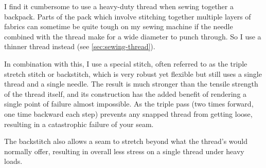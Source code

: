 I find it cumbersome to use a heavy-duty thread when sewing together a backpack. Parts of the pack which involve stitching together multiple layers of fabrics can sometime be quite tough on my sewing machine if the needle combined with the thread make for a wide diameter to punch through. So I use a thinner thread instead (see \ref{sec:sewing-thread}).

In combination with this, I use a special stitch, often referred to as the triple stretch stitch or backstitch, which is very robust yet flexible but still uses a single thread and a single needle. The result is much stronger than the tensile strength of the thread itself, and its construction has the added benefit of rendering a single point of failure almost impossible. As the triple pass (two times forward, one time backward each step) prevents any snapped thread from getting loose, resulting in a catastrophic failure of your seam.

The backstitch also allows a seam to stretch beyond what the thread's would normally offer, resulting in overall less stress on a single thread under heavy loads.
